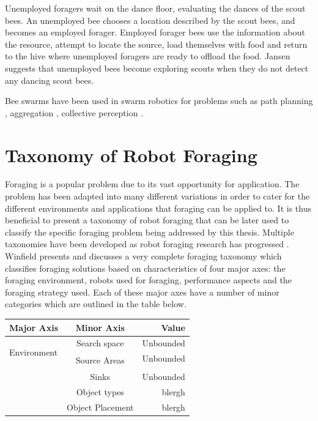 Unemployed foragers wait on the dance floor, evaluating the dances of the scout bees. An  unemployed bee chooses a location described by the scout bees, and becomes an employed forager. Employed forager bees use the information about the resource, attempt to locate the source, load themselves with food and return to the hive where unemployed foragers are ready to offload the food. Jansen \cite{janson2007searching} suggests that unemployed bees become exploring scouts when they do not detect any dancing scout bees. 

Bee swarms have been used in swarm robotics for problems such as path planning \cite{lin2009chaotic}, aggregation \cite{kernbach2009re}, collective perception \cite{schmickl2007collective}. 



\section{Taxonomy of Robot Foraging}
\label{sec:second:taxonomy}

Foraging is a popular problem due to its vast opportunity for application. The problem has been adapted into many different variations in order to cater for the different environments and applications that foraging can be applied to. It is thus beneficial to present a taxonomy of robot foraging that can be later used to classify the specific foraging problem being addressed by this thesis. Multiple taxonomies have been developed as robot foraging research has progressed \cite{oster1978caste,ostergaard2001emergent}. Winfield presents and discusses a very complete foraging taxonomy which classifies foraging solutions based on characteristics of four major axes: the foraging environment, robots used for foraging, performance aspects and the foraging strategy used. Each of these major axes have a number of minor categories which are outlined in the table below.  

\begin{tabular}{l | c | r }
	\hline
	Major Axis & Minor Axis & Value  \\ \hline
	\multirow{3}{*}{Environment} & Search space & Unbounded \\ 
	& \multirow{2}{*}{Source Areas} & Unbounded \\ 
								& Constrained \\
	& Sinks & Unbounded \\
	& Object types & blergh \\
	& Object Placement & blergh \\
\end{tabular}

